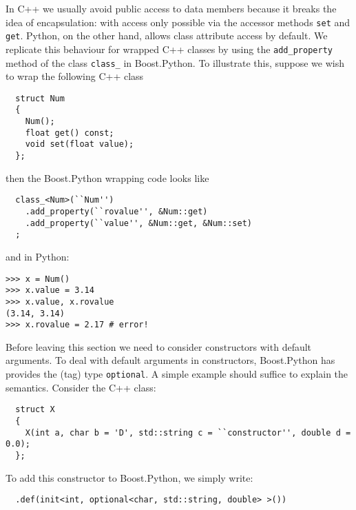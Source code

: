 In C++ we usually avoid public access to data members because it breaks the idea of encapsulation: with access only possible via the accessor methods \verb|set| and \verb|get|. Python, on the other hand, allows class attribute access by default. We replicate this behaviour for wrapped C++ classes by using the \verb|add_property| method of the class \verb|class_| in Boost.Python. To illustrate this, suppose we wish to wrap the following C++ class
\begin{verbatim}
  struct Num
  {
    Num();
    float get() const;
    void set(float value);
  };
\end{verbatim} 
then the Boost.Python wrapping code looks like
\begin{verbatim}
  class_<Num>(``Num'')
    .add_property(``rovalue'', &Num::get)
    .add_property(``value'', &Num::get, &Num::set)
  ;
\end{verbatim}
and in Python:
\begin{verbatim}
>>> x = Num()
>>> x.value = 3.14
>>> x.value, x.rovalue
(3.14, 3.14)
>>> x.rovalue = 2.17 # error!
\end{verbatim}

Before leaving this section we need to consider constructors with default arguments. To deal with default arguments in constructors, Boost.Python has provides the (tag) type \verb|optional|. A simple example should suffice to explain the semantics. Consider the C++ class:
\begin{verbatim}
  struct X
  {
    X(int a, char b = 'D', std::string c = ``constructor'', double d = 0.0);
  };
\end{verbatim}
To add this constructor to Boost.Python, we simply write:
\begin{verbatim}
  .def(init<int, optional<char, std::string, double> >())
\end{verbatim}

